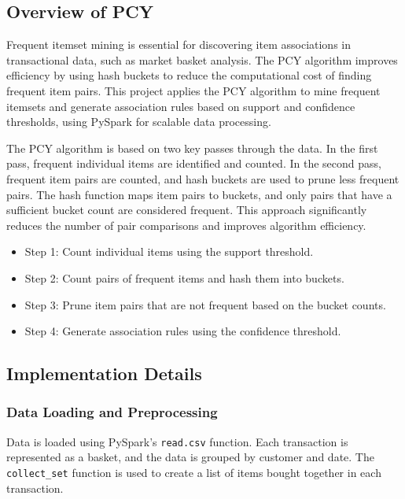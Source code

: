 \subsection{Overview of PCY}
\label{subsec:overview-of-pcy}
Frequent itemset mining is essential for discovering item associations in transactional data, such as market basket analysis.
The PCY algorithm improves efficiency by using hash buckets to reduce the computational cost of finding frequent item pairs.
This project applies the PCY algorithm to mine frequent itemsets and generate association rules based on support and confidence thresholds, using PySpark for scalable data processing.

The PCY algorithm is based on two key passes through the data.
In the first pass, frequent individual items are identified and counted.
In the second pass, frequent item pairs are counted, and hash buckets are used to prune less frequent pairs.
The hash function maps item pairs to buckets, and only pairs that have a sufficient bucket count are considered frequent.
This approach significantly reduces the number of pair comparisons and improves algorithm efficiency.

\begin{itemize}
    \item Step 1: Count individual items using the support threshold.
    \item Step 2: Count pairs of frequent items and hash them into buckets.
    \item Step 3: Prune item pairs that are not frequent based on the bucket counts.
    \item Step 4: Generate association rules using the confidence threshold.
\end{itemize}

\subsection{Implementation Details}
\label{subsec:implementation-details}

\subsubsection{Data Loading and Preprocessing}
Data is loaded using PySpark’s \texttt{read.csv} function.
Each transaction is represented as a basket, and the data is grouped by customer and date. The \texttt{collect\_set} function is used to create a list of items bought together in each transaction.

